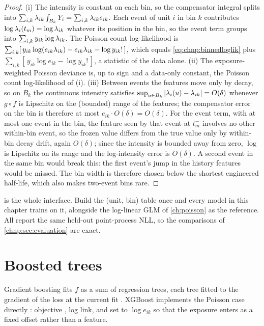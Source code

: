 \begin{proof}
(i) The intensity is constant on each bin, so the compensator integral
splits into $\sum_{i,k} \lambda_{ik} \int_{B_k} Y_i =
\sum_{i,k} \lambda_{ik} e_{ik}$. Each event of unit $i$ in bin $k$
contributes $\log\lambda_i(t_m) = \log\lambda_{ik}$ whatever its position in
the bin, so the event term groups into $\sum_{i,k} y_{ik}\log\lambda_{ik}$.
The Poisson count log-likelihood is
$\sum_{i,k} [\, y_{ik}\log(e_{ik}\lambda_{ik}) - e_{ik}\lambda_{ik}
- \log y_{ik}! \,]$, which equals \cref{eq:chnp:binnedloglik} plus
$\sum_{i,k} [\, y_{ik}\log e_{ik} - \log y_{ik}! \,]$, a statistic of
the data alone.
(ii) The exposure-weighted Poisson deviance is, up to sign and a
data-only constant, the Poisson count log-likelihood of (i).
(iii) Between events the features move only by decay, so on $B_k$ the
continuous intensity satisfies
$\sup_{u \in B_k} \left|\lambda_i(u) - \lambda_{ik}\right| = O(\delta)$ whenever
$g \circ f$ is Lipschitz on the (bounded) range of the features; the
compensator error on the bin is therefore at most $e_{ik} \cdot
O(\delta) = O(\delta)$. For the event term, with at most one event in
the bin, the feature seen by that event at $t_m^-$ involves no other
within-bin event, so the frozen value differs from the true value only
by within-bin decay drift, again $O(\delta)$; since the intensity is
bounded away from zero, $\log$ is Lipschitz on its range and the
log-intensity error is $O(\delta)$. A second event in the same bin would
break this: the first event's jump in the history features would be
missed. The bin width is therefore chosen below the shortest engineered
half-life, which also makes two-event bins rare.
\end{proof}

\begin{remark}\label{rem:chnp:onetable}
 is the whole interface. Build the (unit, bin)
table once and every model in this chapter trains on it, alongside the
log-linear GLM of \cref{ch:poisson} as the reference. All report the
same held-out point-process NLL, so the comparisons of
\cref{chnp:sec:evaluation} are exact.
\end{remark}

\section{Boosted trees}\label{chnp:sec:trees}

Gradient boosting fits $f$ as a sum of regression trees, each tree
fitted to the gradient of the loss at the current fit
\citep{friedman2001}. XGBoost implements the Poisson case directly
\citep{chenguestrin2016}: objective , log link, and
 set to $\log e_{ik}$ so that the exposure enters as
a fixed offset rather than a feature.

